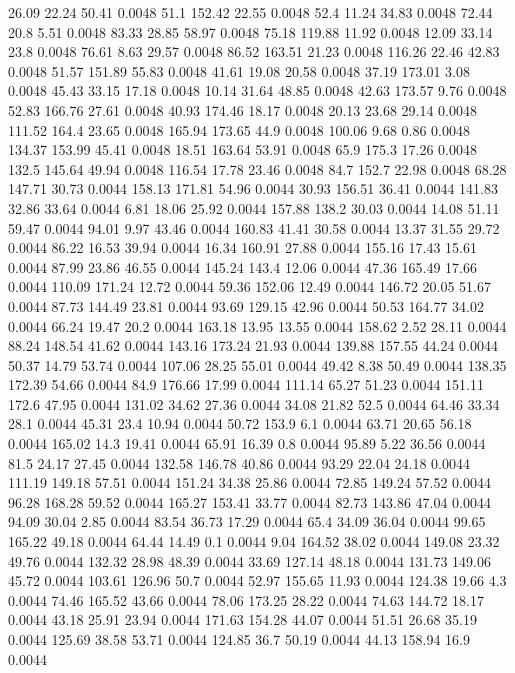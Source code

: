 26.09	22.24	50.41	0.0048
51.1	152.42	22.55	0.0048
52.4	11.24	34.83	0.0048
72.44	20.8	5.51	0.0048
83.33	28.85	58.97	0.0048
75.18	119.88	11.92	0.0048
12.09	33.14	23.8	0.0048
76.61	8.63	29.57	0.0048
86.52	163.51	21.23	0.0048
116.26	22.46	42.83	0.0048
51.57	151.89	55.83	0.0048
41.61	19.08	20.58	0.0048
37.19	173.01	3.08	0.0048
45.43	33.15	17.18	0.0048
10.14	31.64	48.85	0.0048
42.63	173.57	9.76	0.0048
52.83	166.76	27.61	0.0048
40.93	174.46	18.17	0.0048
20.13	23.68	29.14	0.0048
111.52	164.4	23.65	0.0048
165.94	173.65	44.9	0.0048
100.06	9.68	0.86	0.0048
134.37	153.99	45.41	0.0048
18.51	163.64	53.91	0.0048
65.9	175.3	17.26	0.0048
132.5	145.64	49.94	0.0048
116.54	17.78	23.46	0.0048
84.7	152.7	22.98	0.0048
68.28	147.71	30.73	0.0044
158.13	171.81	54.96	0.0044
30.93	156.51	36.41	0.0044
141.83	32.86	33.64	0.0044
6.81	18.06	25.92	0.0044
157.88	138.2	30.03	0.0044
14.08	51.11	59.47	0.0044
94.01	9.97	43.46	0.0044
160.83	41.41	30.58	0.0044
13.37	31.55	29.72	0.0044
86.22	16.53	39.94	0.0044
16.34	160.91	27.88	0.0044
155.16	17.43	15.61	0.0044
87.99	23.86	46.55	0.0044
145.24	143.4	12.06	0.0044
47.36	165.49	17.66	0.0044
110.09	171.24	12.72	0.0044
59.36	152.06	12.49	0.0044
146.72	20.05	51.67	0.0044
87.73	144.49	23.81	0.0044
93.69	129.15	42.96	0.0044
50.53	164.77	34.02	0.0044
66.24	19.47	20.2	0.0044
163.18	13.95	13.55	0.0044
158.62	2.52	28.11	0.0044
88.24	148.54	41.62	0.0044
143.16	173.24	21.93	0.0044
139.88	157.55	44.24	0.0044
50.37	14.79	53.74	0.0044
107.06	28.25	55.01	0.0044
49.42	8.38	50.49	0.0044
138.35	172.39	54.66	0.0044
84.9	176.66	17.99	0.0044
111.14	65.27	51.23	0.0044
151.11	172.6	47.95	0.0044
131.02	34.62	27.36	0.0044
34.08	21.82	52.5	0.0044
64.46	33.34	28.1	0.0044
45.31	23.4	10.94	0.0044
50.72	153.9	6.1	0.0044
63.71	20.65	56.18	0.0044
165.02	14.3	19.41	0.0044
65.91	16.39	0.8	0.0044
95.89	5.22	36.56	0.0044
81.5	24.17	27.45	0.0044
132.58	146.78	40.86	0.0044
93.29	22.04	24.18	0.0044
111.19	149.18	57.51	0.0044
151.24	34.38	25.86	0.0044
72.85	149.24	57.52	0.0044
96.28	168.28	59.52	0.0044
165.27	153.41	33.77	0.0044
82.73	143.86	47.04	0.0044
94.09	30.04	2.85	0.0044
83.54	36.73	17.29	0.0044
65.4	34.09	36.04	0.0044
99.65	165.22	49.18	0.0044
64.44	14.49	0.1	0.0044
9.04	164.52	38.02	0.0044
149.08	23.32	49.76	0.0044
132.32	28.98	48.39	0.0044
33.69	127.14	48.18	0.0044
131.73	149.06	45.72	0.0044
103.61	126.96	50.7	0.0044
52.97	155.65	11.93	0.0044
124.38	19.66	4.3	0.0044
74.46	165.52	43.66	0.0044
78.06	173.25	28.22	0.0044
74.63	144.72	18.17	0.0044
43.18	25.91	23.94	0.0044
171.63	154.28	44.07	0.0044
51.51	26.68	35.19	0.0044
125.69	38.58	53.71	0.0044
124.85	36.7	50.19	0.0044
44.13	158.94	16.9	0.0044
